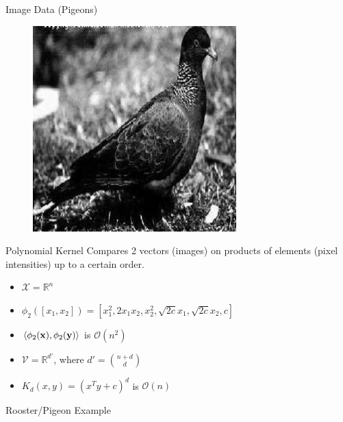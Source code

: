 \documentclass{beamer}
\begin{document}
\begin{frame}{Image Data (Pigeons)}
\begin{figure}
    \includegraphics[scale=.35]{pigeonrs-image_0004.jpg}
  \end{figure}
\end{frame}

\begin{frame}{Polynomial Kernel}
  Compares 2 vectors (images) on products of elements (pixel intensities)
  up to a certain order.
  \begin{itemize}
    \item $\mathcal{X} = \mathbb{R}^{n}$ \pause
    \item $\phi_2 ([x_1, x_2]) = [x_1^2,  2x_1x_2,  x_2^2, \sqrt{2c}x_1, \sqrt{2c}x_2, c]$ \pause
    \item $\langle \phi_2({\bf x}), \phi_2({\bf y}) \rangle$ is $\mathcal{O}(n^2)$ \pause
    \item $\mathcal{V} = \mathbb{R}^{d'}$, where $d' = \binom{n+d}{d}$ \pause
    \item $K_d(x,y) = (x^T y  + c)^d$ is $\mathcal{O}(n)$
  \end{itemize}
\end{frame}

\begin{frame}{Rooster/Pigeon Example}
  \begin{center}
    \resizebox{10.0cm}{!}{
      
    }
  \end{center}
\end{frame}
\end{document}
